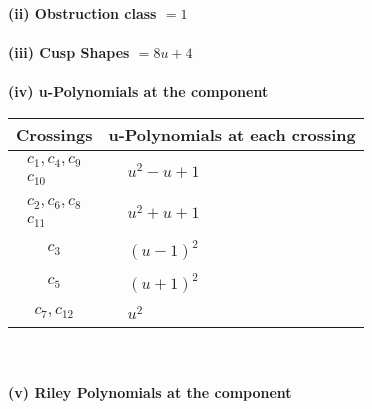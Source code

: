 \documentclass[1p]{elsarticle_modified}
\theoremstyle{definition}
\begin{document}
\flushleft \textbf{(ii) Obstruction class $= 1$}\\~\\
\flushleft \textbf{(iii) Cusp Shapes $= 8 u+4$}\\~\\
\newpage\renewcommand{\arraystretch}{1}
\flushleft \textbf{(iv) u-Polynomials at the component}\newline \\
\begin{tabular}{m{50pt}|m{274pt}}
Crossings & \hspace{64pt}u-Polynomials at each crossing \\
\hline $$\begin{aligned}c_{1},c_{4},c_{9}\\c_{10}\end{aligned}$$&$\begin{aligned}
&u^2- u+1
\end{aligned}$\\
\hline $$\begin{aligned}c_{2},c_{6},c_{8}\\c_{11}\end{aligned}$$&$\begin{aligned}
&u^2+u+1
\end{aligned}$\\
\hline $$\begin{aligned}c_{3}\end{aligned}$$&$\begin{aligned}
&(u-1)^2
\end{aligned}$\\
\hline $$\begin{aligned}c_{5}\end{aligned}$$&$\begin{aligned}
&(u+1)^2
\end{aligned}$\\
\hline $$\begin{aligned}c_{7},c_{12}\end{aligned}$$&$\begin{aligned}
&u^2
\end{aligned}$\\
\hline
\end{tabular}\\~\\
\newpage\renewcommand{\arraystretch}{1}
\flushleft \textbf{(v) Riley Polynomials at the component}\newline \\
\end{document}
